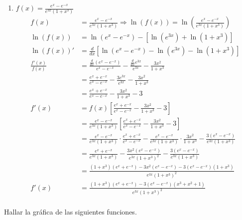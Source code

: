 \documentclass[12pt]{article}
\begin{document}
\begin{enumerate}[\hspace{9px} a)]
    \item \(f(x)=\displaystyle\frac{e^x-e^{-x}}{e^{3x}(1+x^3)}\)\bigskip
        \begin{align*}
            f(x)&=\frac{e^x-e^{-x}}{e^{3x}(1+x^3)} \Longrightarrow \ln(f(x)) = \ln\left(\frac{e^x-e^{-x}}{e^{3x}(1+x^3)}\right)\\
            \ln(f(x))&= \ln(e^x-e^{-x}) - [\ln(e^{3x}) + \ln(1+x^3)]\\
            \ln(f(x))' &= \frac{d}{dx}\left[\ln(e^x-e^{-x}) - \ln(e^{3x}) - \ln(1+x^3)\right]\\
            \frac{f'(x)}{f(x)} &= \frac{\frac{d}{dx}(e^x-e^{-x})}{e^x-e^{-x}} - \frac{\frac{d}{dx}e^{3x}}{e^{3x}} - \frac{3x^2}{1+x^3}\\
            &= \frac{e^x+e^{-x}}{e^x-e^{-x}} - \frac{3e^{3x}}{e^{3x}} - \frac{3x^2}{1+x^3}\\
            &= \frac{e^x+e^{-x}}{e^x-e^{-x}} - \frac{3x^2}{1+x^3} -3\\
            f'(x) &= f(x)\left[\frac{e^x+e^{-x}}{e^x-e^{-x}} - \frac{3x^2}{1+x^3} -3\right]\\
            &= \frac{e^x-e^{-x}}{e^{3x}(1+x^3)}\left[\frac{e^x+e^{-x}}{e^x-e^{-x}} - \frac{3x^2}{1+x^3} -3\right]\\
            &= \frac{e^x-e^{-x}}{e^{3x}(1+x^3)}\cdot\frac{e^x+e^{-x}}{e^x-e^{-x}} -\frac{e^x-e^{-x}}{e^{3x}(1+x^3)}\cdot\frac{3x^2}{1+x^3} -\frac{3(e^x-e^{-x})}{e^{3x}(1+x^3)}\\
            &= \frac{e^x+e^{-x}}{e^{3x}(1+x^3)} - \frac{3x^2(e^x-e^{-x})}{e^{3x}(1+x^3)^2} - \frac{3(e^x-e^{-x})}{e^{3x}(1+x^3)}\\
            &= \frac{(1+x^3)(e^x+e^{-x})-3x^2(e^x-e^{-x})-3(e^x-e^{-x})(1+x^3)}{e^{3x}(1+x^3)^2}\\
            f'(x) &= \frac{(1+x^3)(e^x+e^{-x})-3(e^x-e^{-x})(x^3+x^2+1)}{e^{3x}(1+x^3)^2}\\
        \end{align*}

\end{enumerate}

Hallar la gr\'afica de las siguientes funciones.
\end{document}
